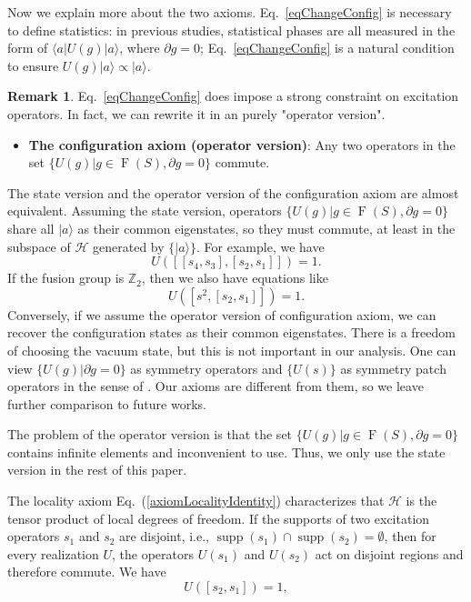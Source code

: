 \documentclass[reprint, amsmath, amssymb, showpacs, floatfix, longbibliography, aps, twocolumn, superscriptaddress, nofootinbib]{revtex4-2}
\newcommand{\ZZ}{{\mathbb Z}}
\theoremstyle{definition}
\newtheorem{remark}{Remark}[section]
\begin{document}
 Now we explain more about the two axioms. Eq.~\eqref{eqChangeConfig} is necessary to define statistics: in previous studies, statistical phases are all measured in the form of $\langle a|U(g)|a\rangle$, where $\partial g=0$; Eq.~\eqref{eqChangeConfig} is a natural condition to ensure $U(g)|a\rangle\propto |a\rangle$. 
 
 \begin{remark}
 	 Eq.~\eqref{eqChangeConfig} does impose a strong constraint on excitation operators. In fact, we can rewrite it in an purely "operator version". 
 	\begin{itemize}
 		\item \textbf{The configuration axiom (operator version)}: Any two operators in the set $\{U(g)|g\in \operatorname{F}(S),\partial g=0\}$ commute.
 	\end{itemize}
 	The state version and the operator version of the configuration axiom are almost equivalent. Assuming the state version, operators $\{U(g)|g\in \operatorname{F}(S),\partial g=0\}$ share all $|a\rangle$ as their common eigenstates, so they must commute, at least in the subspace of $\mathcal{H}$ generated by $\{|a\rangle\}$. For example, we have
 	\begin{equation}\label{eqCommute}
 		U([[s_4,s_3],[s_2,s_1]])=1.
 	\end{equation}
 	If the fusion group is $\ZZ_2$, then we also have equations like
 	\begin{equation}
 		U([s^2,[s_2,s_1]])=1.
 	\end{equation}
 	Conversely, if we assume the operator version of configuration axiom, we can recover the configuration states as their common eigenstates. There is a freedom of choosing the vacuum state, but this is not important in our analysis. 
 	One can view $\{U(g)|\partial g=0\}$ as symmetry operators and $\{U(s)\}$ as symmetry patch operators in the sense of \cite{chatterjee-2023}. Our axioms are different from them, so we leave further comparison to future works.
 	
 	The problem of the operator version is that the set $\{U(g)|g\in \operatorname{F}(S),\partial g=0\}$ contains infinite elements and inconvenient to use. Thus, we only use the state version in the rest of this paper.
 \end{remark}
 

The locality axiom Eq.~(\ref{axiomLocalityIdentity}) characterizes that $\mathcal{H}$ is the tensor product of local degrees of freedom. If the supports of two excitation operators \(s_1\) and \(s_2\) are disjoint, i.e., \(\operatorname{supp}(s_1) \cap \operatorname{supp}(s_2) = \emptyset\), then for every realization \(U\), the operators \( U(s_1)\) and \( U(s_2)\) act on disjoint regions and therefore commute. We have
 \begin{equation}\label{eqCommutator}
 	 U([s_2, s_1]) = 1,
 \end{equation}
\end{document}
